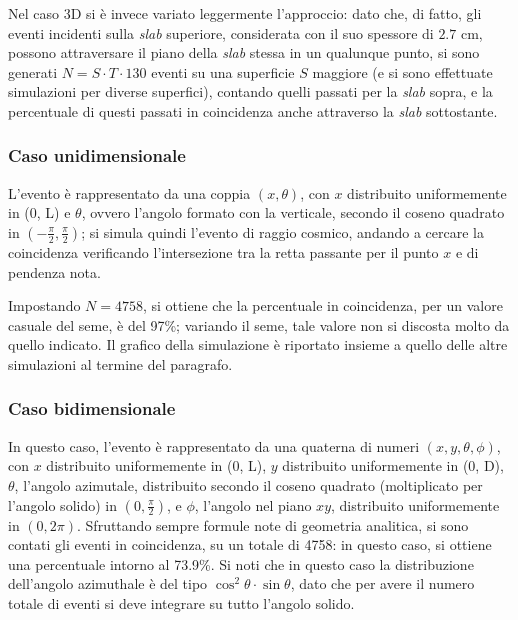Nel caso 3D si è invece variato leggermente l'approccio: dato che, di fatto, gli eventi incidenti sulla \emph{slab} superiore, considerata con il suo spessore di $2.7$ cm, possono attraversare il piano della \emph{slab} stessa in un qualunque punto, si sono generati $N=S\cdot T\cdot 130$ eventi su una superficie $S$ maggiore (e si sono effettuate simulazioni per diverse superfici), contando quelli passati per la \emph{slab} sopra, e la percentuale di questi passati in coincidenza anche attraverso la \emph{slab} sottostante.

\subsubsection{Caso unidimensionale}
L'evento è rappresentato da una coppia $(x, \theta)$, con $x$ distribuito uniformemente in (0, L) e $\theta$, ovvero l'angolo formato con la verticale, secondo il coseno quadrato in $(-\frac{\pi}{2}, \frac{\pi}{2})$; si simula quindi l'evento di raggio cosmico, andando a cercare la coincidenza verificando l'intersezione tra la retta passante per il punto $x$ e di pendenza nota.

Impostando $N = 4758$, si ottiene che la percentuale in coincidenza, per un valore casuale del seme, è del 97\%; variando il seme, tale valore non si discosta molto da quello indicato. Il grafico della simulazione è riportato insieme a quello delle altre simulazioni al termine del paragrafo.

\subsubsection{Caso bidimensionale}
In questo caso, l'evento è rappresentato da una quaterna  di numeri $(x,y,\theta,\phi)$, con $x$ distribuito uniformemente in (0, L), $y$ distribuito uniformemente in (0, D), $\theta$, l'angolo azimutale, distribuito secondo il coseno quadrato (moltiplicato per l'angolo solido) in $(0, \frac{\pi}{2})$, e $\phi$, l'angolo nel piano $xy$, distribuito uniformemente in $(0, 2\pi)$. Sfruttando sempre formule note di geometria analitica, si sono contati gli eventi in coincidenza, su un totale di 4758: in questo caso, si ottiene una percentuale intorno al 73.9\%.
Si noti che in questo caso la distribuzione dell'angolo azimuthale è del tipo $\cos ^2\theta \cdot \sin\theta$, dato che per avere il numero totale di eventi si deve integrare su tutto l'angolo solido.

